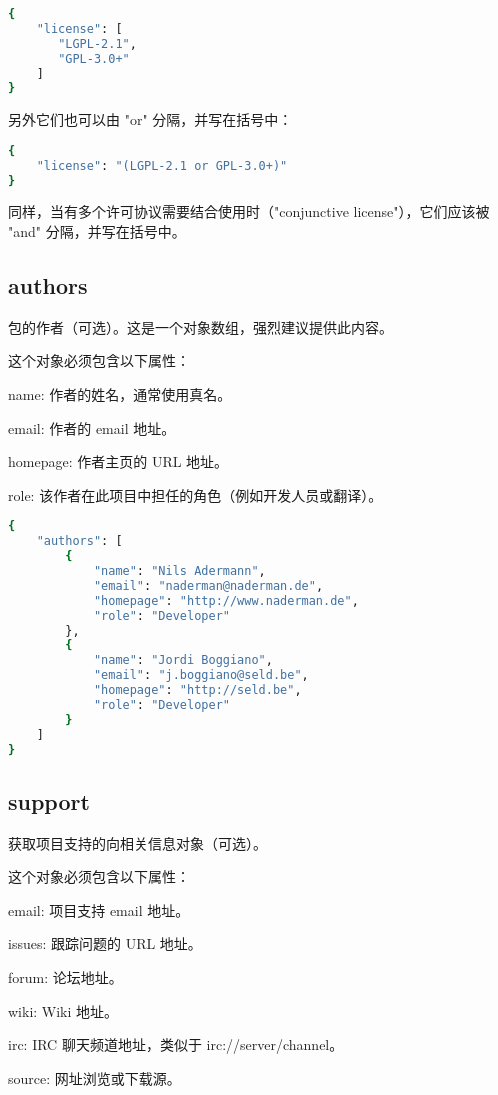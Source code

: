 \begin{lstlisting}[language=bash]
{
    "license": [
       "LGPL-2.1",
       "GPL-3.0+"
    ]
}
\end{lstlisting}

另外它们也可以由 "or" 分隔，并写在括号中：

\begin{lstlisting}[language=bash]
{
    "license": "(LGPL-2.1 or GPL-3.0+)"
}
\end{lstlisting}

同样，当有多个许可协议需要结合使用时（"conjunctive license"），它们应该被 "and" 分隔，并写在括号中。

\subsection{authors}

包的作者（可选）。这是一个对象数组，强烈建议提供此内容。

这个对象必须包含以下属性：

\begin{compactitem}
\item name: 作者的姓名，通常使用真名。
\item email: 作者的 email 地址。
\item homepage: 作者主页的 URL 地址。
\item role: 该作者在此项目中担任的角色（例如开发人员或翻译）。
\end{compactitem}


\begin{lstlisting}[language=bash]
{
    "authors": [
        {
            "name": "Nils Adermann",
            "email": "naderman@naderman.de",
            "homepage": "http://www.naderman.de",
            "role": "Developer"
        },
        {
            "name": "Jordi Boggiano",
            "email": "j.boggiano@seld.be",
            "homepage": "http://seld.be",
            "role": "Developer"
        }
    ]
}
\end{lstlisting}

\subsection{support}

获取项目支持的向相关信息对象（可选）。

这个对象必须包含以下属性：

\begin{compactitem}
\item email: 项目支持 email 地址。
\item issues: 跟踪问题的 URL 地址。
\item forum: 论坛地址。
\item wiki: Wiki 地址。
\item irc: IRC 聊天频道地址，类似于 irc://server/channel。
\item source: 网址浏览或下载源。
\end{compactitem}


